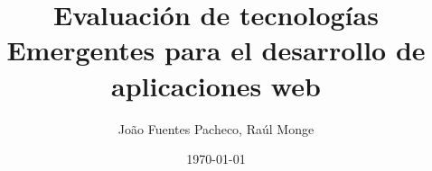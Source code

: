 \documentclass[letter, 11pt]{article}
\begin{document}
\title{Evaluación de tecnologías Emergentes para el desarrollo de aplicaciones web }
\author{Jo\~ao Fuentes Pacheco, Raúl Monge}
\date{\today}
\maketitle

\newpage
\newpage
























\end{document}
